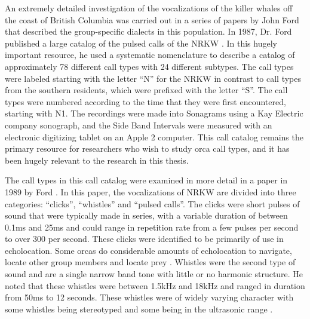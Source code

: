 An extremely detailed investigation of the vocalizations of the killer
whales off the coast of British Columbia was carried out in a series
of papers by John Ford \cite{ford1982stocks} \cite{ford1983dialects}
that described the group-specific dialects in this population.  In
1987, Dr. Ford published a large catalog of the pulsed calls of the
NRKW \cite{ford1987catalogue}.  In this hugely
important resource, he used a systematic nomenclature to describe a
catalog of approximately 78 different call types with 24 different
subtypes.  The call types were labeled starting with the letter ``N'' for
the NRKW in contrast to call types from the southern
residents, which were prefixed with the letter ``S''.  The call types were
numbered according to the time that they were first encountered,
starting with N1.  The recordings were made into Sonagrams using a Kay
Electric company sonograph, and the Side Band Intervals were measured
with an electronic digitizing tablet on an Apple 2 computer.  This
call catalog remains the primary resource for researchers who wish to
study orca call types, and it has been hugely relevant to the research in
this thesis.

The call types in this call catalog were examined in more detail in a
paper in 1989 by Ford \cite{ford1989acoustic}.  In this paper, the
vocalizations of NRKW are divided into three categories: ``clicks'',
``whistles'' and ``pulsed calls''.  The clicks were short pulses of
sound that were typically made in series, with a variable duration of
between 0.1ms and 25ms and could range in repetition rate from a few
pulses per second to over 300 per second.  These clicks were
identified to be primarily of use in echolocation.  Some orcas do
considerable amounts of echolocation to navigate, locate other group
members and locate prey \cite{barretlennard1996echolocation}.
Whistles were the second type of sound and are a single narrow band
tone with little or no harmonic structure.  He noted that these
whistles were between 1.5kHz and 18kHz and ranged in duration from
50ms to 12 seconds.  These whistles were of widely varying character
with some whistles being stereotyped \cite{riesch2006stability} and
some being in the ultrasonic range \cite{samarra2010killer}
\cite{simonis2012high} \cite{filatova2012ultrasonic}.

